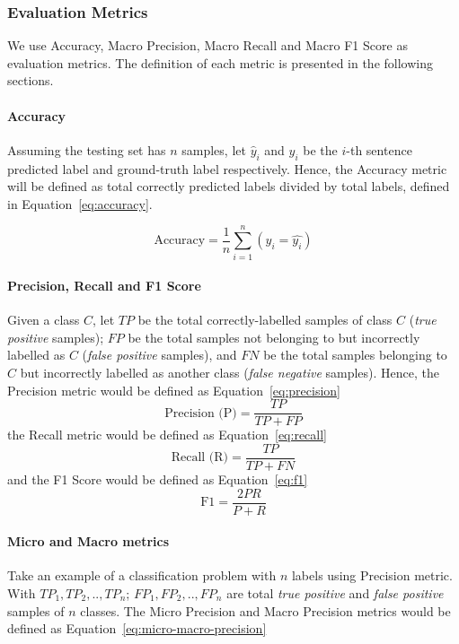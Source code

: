 \documentclass[sn-mathphys,Numbered]{sn-jnl}%
\theoremstyle{thmstyleone}%
\theoremstyle{thmstyletwo}%
\theoremstyle{thmstylethree}%
\begin{document}
\subsubsection{Evaluation Metrics}
We use Accuracy, Macro Precision, Macro Recall and Macro F1 Score as evaluation metrics. The definition of each metric is presented in the following sections.

\paragraph{Accuracy}
Assuming the testing set has $n$ samples, let $\hat{y}_i$ and $y_i$ be the $i$-th sentence predicted label and ground-truth label respectively. Hence, the Accuracy metric will be defined as total correctly predicted labels divided by total labels, defined in Equation~\ref{eq:accuracy}.

\begin{equation}\label{eq:accuracy}
\text{Accuracy} = \frac{1}{n}\displaystyle\sum_{i = 1}^n (y_i = \hat{y_i})
\end{equation}

\paragraph{Precision, Recall and F1 Score}
Given a class $C$, let $TP$ be the total correctly-labelled samples of class $C$ (\textit{true positive} samples); $FP$ be the total samples not belonging to but incorrectly labelled as $C$ (\textit{false positive} samples), and $FN$ be the total samples belonging to $C$ but incorrectly labelled as another class (\textit{false negative} samples). Hence, the Precision metric would be defined as Equation~\ref{eq:precision}
\begin{equation}\label{eq:precision}
\text{Precision (P)} = \frac{TP}{TP + FP}    
\end{equation}
the Recall metric would be defined as Equation~\ref{eq:recall}
\begin{equation}\label{eq:recall}
\text{Recall (R)} = \frac{TP}{TP + FN}
\end{equation}
and the F1 Score would be defined as Equation~\ref{eq:f1}
\begin{equation}\label{eq:f1}
\text{F1} = \frac{2PR}{P + R}
\end{equation}

\paragraph{Micro and Macro metrics}
Take an example of a classification problem with $n$ labels using Precision metric. With $TP_1, TP_2, .., TP_n$; $FP_1, FP_2, .., FP_n$ are total \textit{true positive} and \textit{false positive} samples of $n$ classes. The Micro Precision and Macro Precision metrics would be defined as Equation~\ref{eq:micro-macro-precision}
\end{document}

